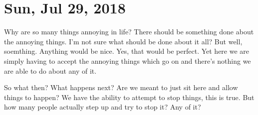 \section{Sun, Jul 29, 2018}

Why are so many things annoying in life? There should be something done about the
annoying things. I'm not sure what should be done about it all? But well, soemthing.
Anything would be nice. Yes, that would be perfect. Yet here we are simply having to
accept the annoying things which go on and there's nothing we are able to do about
any of it.

So what then? What happens next? Are we meant to just sit here and allow things to
happen? We have the ability to attempt to stop things, this is true. But how many
people actually step up and try to stop it? Any of it?
